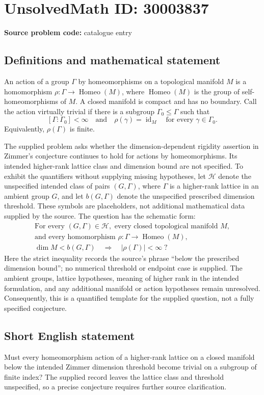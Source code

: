 \documentclass[11pt]{article}
\begin{document}
\section*{UnsolvedMath ID: 30003837}
\textbf{Source problem code:} catalogue entry
\subsection{Definitions and mathematical statement}
An action of a group \(\Gamma\) by homeomorphisms on a topological manifold \(M\) is a homomorphism \(\rho\colon\Gamma\to\operatorname{Homeo}(M)\), where \(\operatorname{Homeo}(M)\) is the group of self-homeomorphisms of \(M\). A closed manifold is compact and has no boundary. Call the action virtually trivial if there is a subgroup \(\Gamma_0\leq\Gamma\) such that
\[
[\Gamma:\Gamma_0]<\infty
\quad\text{and}\quad
\rho(\gamma)=\operatorname{id}_M\quad\text{for every }\gamma\in\Gamma_0.
\]
Equivalently, \(\rho(\Gamma)\) is finite.

The supplied problem asks whether the dimension-dependent rigidity assertion in Zimmer's conjecture continues to hold for actions by homeomorphisms. Its intended higher-rank lattice class and dimension bound are not specified. To exhibit the quantifiers without supplying missing hypotheses, let \(\mathcal H\) denote the unspecified intended class of pairs \((G,\Gamma)\), where \(\Gamma\) is a higher-rank lattice in an ambient group \(G\), and let \(b(G,\Gamma)\) denote the unspecified prescribed dimension threshold. These symbols are placeholders, not additional mathematical data supplied by the source. The question has the schematic form:
\[
\begin{gathered}
\text{For every }(G,\Gamma)\in\mathcal H,\text{ every closed topological manifold }M,\\
\text{and every homomorphism }\rho\colon\Gamma\to\operatorname{Homeo}(M),\\
\dim M<b(G,\Gamma)
\quad\Longrightarrow\quad
\lvert\rho(\Gamma)\rvert<\infty\;?
\end{gathered}
\]
Here the strict inequality records the source's phrase ``below the prescribed dimension bound''; no numerical threshold or endpoint case is supplied. The ambient groups, lattice hypotheses, meaning of higher rank in the intended formulation, and any additional manifold or action hypotheses remain unresolved. Consequently, this is a quantified template for the supplied question, not a fully specified conjecture.
\subsection{Short English statement}
Must every homeomorphism action of a higher-rank lattice on a closed manifold below the intended Zimmer dimension threshold become trivial on a subgroup of finite index? The supplied record leaves the lattice class and threshold unspecified, so a precise conjecture requires further source clarification.
\end{document}

